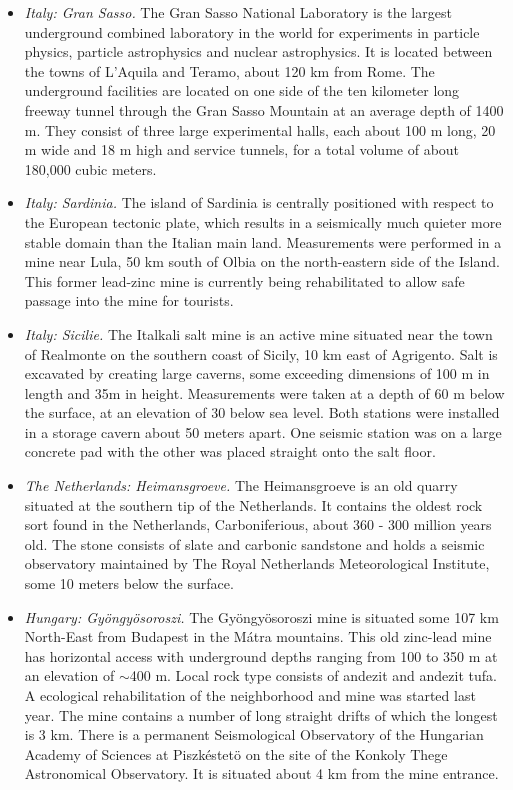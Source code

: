 \begin{itemize}
\item \emph{Italy: Gran Sasso.}
The Gran Sasso National Laboratory is the largest underground combined laboratory in the world for experiments in particle physics, particle astrophysics and nuclear astrophysics. It is located between the towns of L'Aquila and Teramo, about 120 km from Rome. The underground facilities are located on one side of the ten kilometer long freeway tunnel through the Gran Sasso Mountain at an average depth of 1400 m. They consist of three large experimental halls, each about 100 m long, 20 m wide and 18 m high and service tunnels, for a total volume of about 180,000 cubic meters.

\item \emph{Italy: Sardinia.}
The island of Sardinia is centrally positioned with respect to the European tectonic plate, which results in a seismically much quieter more stable domain than the Italian main land. Measurements were performed in a mine near Lula, 50 km south of Olbia on the north-eastern side of the Island. This former lead-zinc mine is currently being rehabilitated to allow safe passage into the mine for tourists. 

\item \emph{Italy: Sicilie.}
The Italkali salt mine is an active mine situated near the town of Realmonte on the southern coast of Sicily, 10 km east of Agrigento. Salt is excavated by creating large caverns, some exceeding dimensions of 100 m in length and 35m in height. Measurements were taken at a depth of 60 m below the surface, at an elevation of 30 below sea level. Both stations were installed in a storage cavern about 50 meters apart. One seismic station was on a large concrete pad with the other was placed straight onto the salt floor.  

\item \emph{The Netherlands: Heimansgroeve.}
The Heimansgroeve is an old quarry situated at the southern tip of the Netherlands. It contains the oldest rock sort found in the Netherlands, Carboniferious, about 360 - 300 million years old. The stone consists of slate and carbonic sandstone and holds a seismic observatory maintained by The Royal Netherlands Meteorological Institute, some 10 meters below the surface.

\item \emph{Hungary: Gy\"ongy\"osoroszi.}
The Gy\"ongy\"osoroszi mine is situated some 107 km North-East from Budapest in the M\'atra mountains. This old zinc-lead mine has horizontal access with underground depths ranging from 100 to 350 m at an elevation of $\sim$400 m. Local rock type consists of andezit and andezit tufa. A ecological rehabilitation of the neighborhood and mine was started last year. The mine contains a number of long straight drifts of which the longest is 3 km. There is a permanent Seismological Observatory of the Hungarian Academy of Sciences at Piszk\'estet\"o on the site of the Konkoly Thege Astronomical Observatory. It is situated about 4 km from the mine entrance.


\end{itemize}
